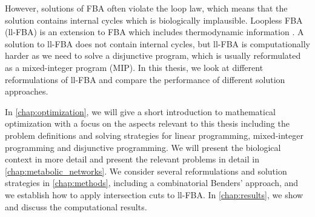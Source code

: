 However, solutions of FBA often violate the loop law, which means that the solution contains internal cycles which is biologically implausible. Loopless FBA (ll-FBA) is an extension to FBA which includes thermodynamic information \cite{elimination_infeasible_loops}. A solution to ll-FBA does not contain internal cycles, but ll-FBA is computationally harder as we need to solve a disjunctive program, which is usually reformulated as a mixed-integer program (MIP). 
In this thesis, we look at different reformulations of ll-FBA and compare the performance of different solution approaches. %



In \cref{chap:optimization}, we will give a short introduction to mathematical optimization with a focus on the aspects relevant to this thesis including the problem definitions and solving strategies for linear programming, mixed-integer programming and disjunctive programming. We will present the biological context in more detail and present the relevant problems in detail in \cref{chap:metabolic_networks}. 
We consider several reformulations and solution strategies in \cref{chap:methods}, including a combinatorial Benders' approach, and we establish how to apply intersection cuts to ll-FBA. In \cref{chap:results}, we show and discuss the computational results. 



